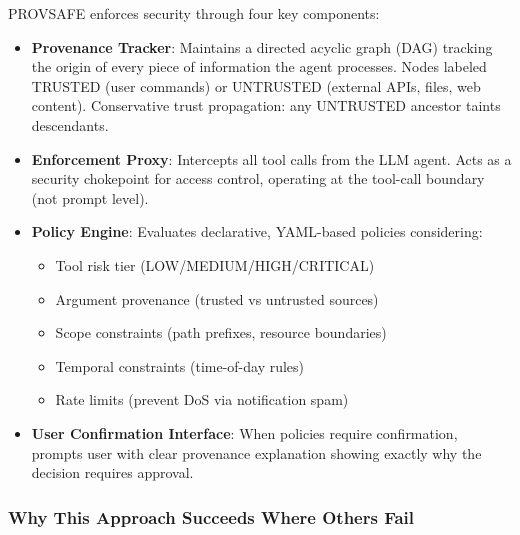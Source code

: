 PROVSAFE enforces security through four key components:

\begin{itemize}[leftmargin=1.2em]
  \item \textbf{Provenance Tracker}: Maintains a directed acyclic graph (DAG) tracking the origin of every piece of information the agent processes. Nodes labeled TRUSTED (user commands) or UNTRUSTED (external APIs, files, web content). Conservative trust propagation: any UNTRUSTED ancestor taints descendants.
  
  \item \textbf{Enforcement Proxy}: Intercepts all tool calls from the LLM agent. Acts as a security chokepoint for access control, operating at the tool-call boundary (not prompt level).
  
  \item \textbf{Policy Engine}: Evaluates declarative, YAML-based policies considering:
    \begin{itemize}[leftmargin=1.2em]
      \item Tool risk tier (LOW/MEDIUM/HIGH/CRITICAL)
      \item Argument provenance (trusted vs untrusted sources)
      \item Scope constraints (path prefixes, resource boundaries)
      \item Temporal constraints (time-of-day rules)
      \item Rate limits (prevent DoS via notification spam)
    \end{itemize}
  
  \item \textbf{User Confirmation Interface}: When policies require confirmation, prompts user with clear provenance explanation showing exactly why the decision requires approval.
\end{itemize}

\subsubsection{Why This Approach Succeeds Where Others Fail}

